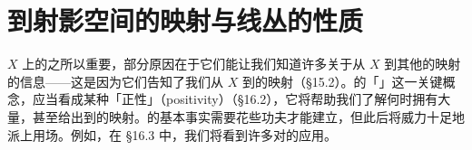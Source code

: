 
\chapter{到射影空间的映射与线丛的性质}
\label{ch:maps-projective-properties}

\trVariety{} $X$ 上的\trLineBundle{}之所以重要，部分原因在于它们能让我们知道许多关于从 $X$ 到其他\trVariety{}的映射的信息——这是因为它们告知了我们从 $X$ 到\trProjectiveSpace{}的映射（\S15.2）。\trLineBundle{}的「\trAmpleness」这一关键概念，应当看成某种「正性」（positivity）（\S16.2），它将帮助我们了解\trLineBundle{}何时拥有大量\trSection，甚至给出到\trProjectiveSpace{}的映射。\trAmpleness{}的基本事实需要花些功夫才能建立，但此后将威力十足地派上用场。例如，在 \S16.3 中，我们将看到许多对\trCurve{}的应用。





